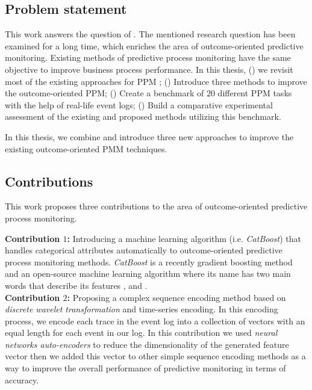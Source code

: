 \subsection{Problem statement}
This work answers the question of .
The mentioned research question has been examined for a long time, which enriches the area of outcome-oriented predictive monitoring.  Existing methods of predictive process monitoring have the same objective to improve business process performance. In this thesis, () we revisit most of the existing approaches for PPM \cite{teinemaa2019outcome}; () Introduce three methods to improve the outcome-oriented PPM; () Create a benchmark of $20$ different PPM tasks with the help of real-life event logs; () Build a comparative experimental assessment of the existing and proposed methods utilizing this benchmark. 

 In this thesis, we combine and introduce three new approaches to improve the existing outcome-oriented PMM techniques.


\subsection{Contributions}

This work proposes three contributions to the area of outcome-oriented predictive process monitoring. 

\noindent \textbf{Contribution $1$:}  Introducing a machine learning algorithm (i.e. \textit{CatBoost}) \cite{prokhorenkova2018catboost} that handles categorical attributes automatically to outcome-oriented predictive process monitoring methods. \textit{CatBoost} is a recently gradient boosting method and an open-source machine learning algorithm where its name has two main words that describe its features , and . \\

\noindent \textbf{Contribution $2$:} Proposing a complex sequence encoding method based on \textit{discrete wavelet transformation} \cite{edwards1991discrete} and time-series encoding. In this encoding process, we encode each trace in the event log into a collection of vectors with an equal length for each event in our log. In this contribution we used \textit{neural networks auto-encoders} to reduce the dimensionality of the generated feature vector then we added this vector to other simple sequence encoding methods as a way to improve the overall performance of predictive monitoring in terms of accuracy.  \\


